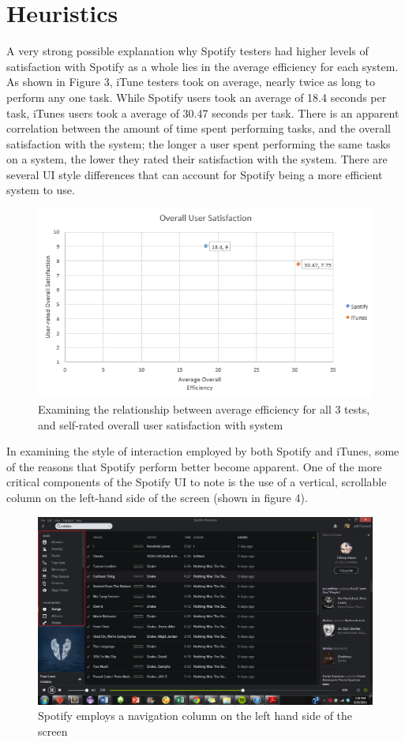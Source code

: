 \documentclass[12pt]{report}
\begin{document}
\section{Heuristics}

A very strong possible explanation why Spotify testers had higher levels of satisfaction with Spotify as a whole lies in the average efficiency for each system. As shown in Figure 3, iTune testers took on average, nearly twice as long to perform any one task. While Spotify users took an average of 18.4 seconds per task, iTunes users took a average of 30.47 seconds per task. There is an apparent correlation between the amount of time spent performing tasks, and the overall satisfaction with the system; the longer a user spent performing the same tasks on a system, the lower they rated their satisfaction with the system. There are several UI style differences that can account for Spotify being a more efficient system to use.

\begin{figure}[H]
	\centering
	\includegraphics[width=.75\textwidth]{chart3.png}
	\caption{Examining the relationship between average efficiency for all 3 tests, and self-rated overall user satisfaction with system}
\end{figure}

In examining the style of interaction employed by both Spotify and iTunes, some of the reasons that Spotify perform better become apparent. One of the more critical components of the Spotify UI to note is the use of a vertical, scrollable column on the left-hand side of the screen (shown in figure 4). 

\begin{figure}[H]
	\centering
	\includegraphics[width=\textwidth]{chart4.png}
	\caption{Spotify employs a navigation column on the left hand side of the screen}
\end{figure}
\end{document}
